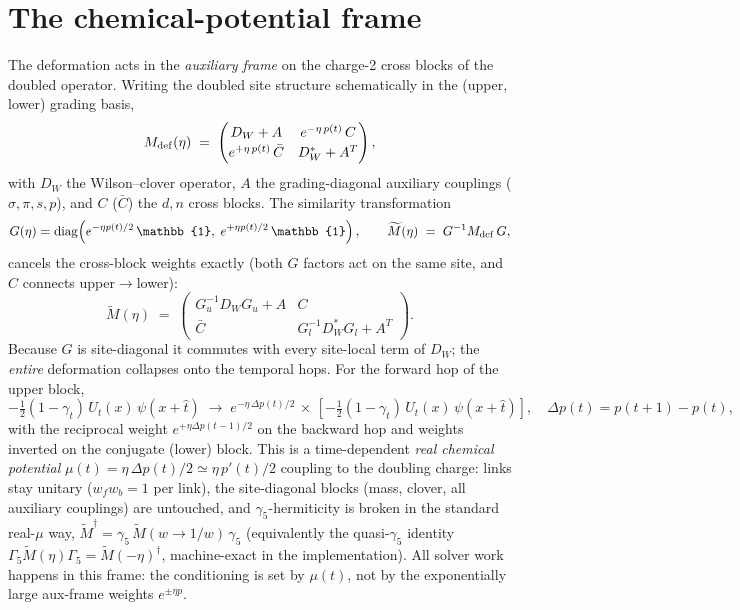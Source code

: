 \documentclass[11pt]{article}
\newcommand{\Mt}{\widetilde{M}}
\begin{document}
\section{The chemical-potential frame}
\label{sec:frame}
The deformation acts in the \emph{auxiliary frame} on the charge-2
cross blocks of the doubled operator.  Writing the doubled site
structure schematically in the (upper, lower) grading basis,
\begin{equation}
M_{\rm def}(\eta)\;=\;
\begin{pmatrix}
D_W + A & e^{-\eta\,p(t)}\,C \\[2pt]
e^{+\eta\,p(t)}\,\bar C & D_W^{*} + A^{T}
\end{pmatrix},
\end{equation}
with $D_W$ the Wilson--clover operator, $A$ the grading-diagonal
auxiliary couplings ($\sigma,\pi,s,p$), and $C$ ($\bar C$) the $d,n$
cross blocks.  The similarity transformation
\begin{equation}
G(\eta) = \mathrm{diag}\!\left(e^{-\eta p(t)/2}\,\mathbb{1},\;
e^{+\eta p(t)/2}\,\mathbb{1}\right),\qquad
\Mt(\eta) \;=\; G^{-1} M_{\rm def}\, G ,
\end{equation}
cancels the cross-block weights exactly (both $G$ factors act on the
same site, and $C$ connects upper$\to$lower):
\begin{equation}
\Mt(\eta)\;=\;
\begin{pmatrix}
G_u^{-1} D_W G_u + A & C \\[2pt]
\bar C & G_l^{-1} D_W^{*} G_l + A^{T}
\end{pmatrix}.
\end{equation}
Because $G$ is site-diagonal it commutes with every site-local term of
$D_W$; the \emph{entire} deformation collapses onto the temporal hops.
For the forward hop of the upper block,
\begin{equation}
-\tfrac12(1-\gamma_t)\,U_t(x)\,\psi(x+\hat t)
\;\longrightarrow\;
e^{-\eta\,\Delta p(t)/2}\,\times\,
\left[-\tfrac12(1-\gamma_t)\,U_t(x)\,\psi(x+\hat t)\right],
\quad \Delta p(t)=p(t{+}1)-p(t),
\end{equation}
with the reciprocal weight $e^{+\eta \Delta p(t-1)/2}$ on the backward
hop and weights inverted on the conjugate (lower) block.  This is a
time-dependent \emph{real chemical potential}
$\mu(t)=\eta\,\Delta p(t)/2 \simeq \eta\,p'(t)/2$ coupling to the
doubling charge: links stay unitary ($w_f w_b = 1$ per link), the
site-diagonal blocks (mass, clover, all auxiliary couplings) are
untouched, and $\gamma_5$-hermiticity is broken in the standard
real-$\mu$ way, $\Mt^\dagger = \gamma_5\,\Mt(w\to 1/w)\,\gamma_5$
(equivalently the quasi-$\gamma_5$ identity
$\Gamma_5 \Mt(\eta)\Gamma_5 = \Mt(-\eta)^\dagger$, machine-exact in the
implementation).  All solver work happens in this frame: the
conditioning is set by $\mu(t)$, not by the exponentially large
aux-frame weights $e^{\pm\eta p}$.
\end{document}
